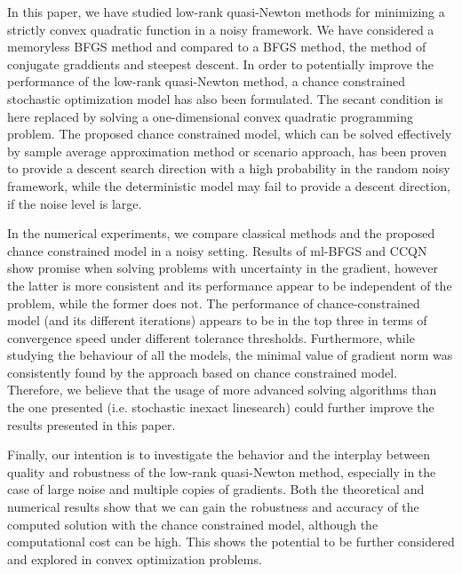 \documentclass[11pt,twoside]{article}
\def\AFcomment#1{{\color{red}\emph{AF: #1}}}
\begin{document}
In this paper, we have studied low-rank quasi-Newton methods for
minimizing a strictly convex quadratic function in a noisy framework.
We have considered a memoryless BFGS method and compared to a BFGS
method, the method of conjugate graddients and steepest descent.
In order to potentially improve the performance of the
low-rank quasi-Newton method, a chance constrained stochastic
optimization model has also been formulated.
The secant condition is here replaced by solving a one-dimensional convex
quadratic programming problem.  %
The proposed chance constrained model, which can be solved effectively by sample average approximation method or scenario approach, has been proven to provide a descent search direction with a high probability in the random noisy framework, while the deterministic model may fail to provide a descent direction,
if the noise level is large.

\iffalse
The chance constrained model is further reformulated by using a few simplifications and approximated by sample
average approximation method. Scenario approach can be also applied to
solve the chance constrained model as a linear problem, which makes
the approach viable for large size problems.
\fi

In the numerical experiments, we compare classical methods and the
proposed chance constrained model in a noisy setting.  Results of
ml-BFGS and CCQN show promise when solving problems with uncertainty
in the gradient, however the latter is more consistent and its
performance appear to be independent of the problem, while the former
does not.  The performance of chance-constrained model (and its
different iterations) appears to be in the top three in terms of
convergence speed under different tolerance thresholds.
Furthermore, while studying the behaviour of all the models, the minimal value of gradient norm was consistently found by the approach based on chance constrained model.
Therefore, we believe that the usage of more advanced solving algorithms than the one presented (i.e. stochastic inexact linesearch) could further improve the results presented in this paper.

Finally, our intention is to investigate the behavior and the interplay between quality and robustness of the low-rank quasi-Newton method, especially in the case of large noise and multiple copies of gradients.
Both the theoretical and numerical results show that we can gain the robustness and accuracy of the computed solution with the chance constrained model, although the computational cost can be high.
This shows the potential to be further considered and explored in convex optimization problems.
\end{document}
